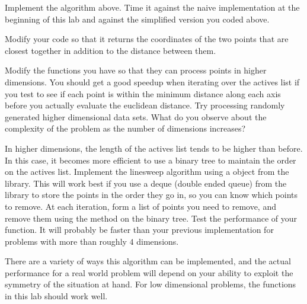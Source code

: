 \begin{problem}
Implement the algorithm above. 
Time it against the naive implementation at the beginning of this lab and against the simplified version you coded above.
\end{problem}

\begin{problem}
Modify your code so that it returns the coordinates of the two points that are closest together in addition to the distance between them.
\end{problem}

\begin{problem}
Modify the functions you have so that they can process points in higher dimensions. 
You should get a good speedup when iterating over the actives list if you test to see if each point is within the minimum distance along each axis before you actually evaluate the euclidean distance. 
Try processing randomly generated higher dimensional data sets. 
What do you observe about the complexity of the problem as the number of dimensions increases?
\end{problem}

\begin{problem}
In higher dimensions, the length of the actives list tends to be higher than before. In this case, it becomes more efficient to use a binary tree to maintain the order on the actives list. 
Implement the linesweep algorithm using a  object from the  library. 
This will work best if you use a deque (double ended queue) from the  library to store the points in the order they go in, so you can know which points to remove. 
At each iteration, form a list of points you need to remove, and remove them using the  method on the binary tree. 
Test the performance of your function. 
It will probably be faster than your previous implementation for problems with more than roughly $4$ dimensions. 
\end{problem}

There are a variety of ways this algorithm can be implemented, and the actual performance for a real world problem will depend on your ability to exploit the symmetry of the situation at hand. 
For low dimensional problems, the functions in this lab should work well.
